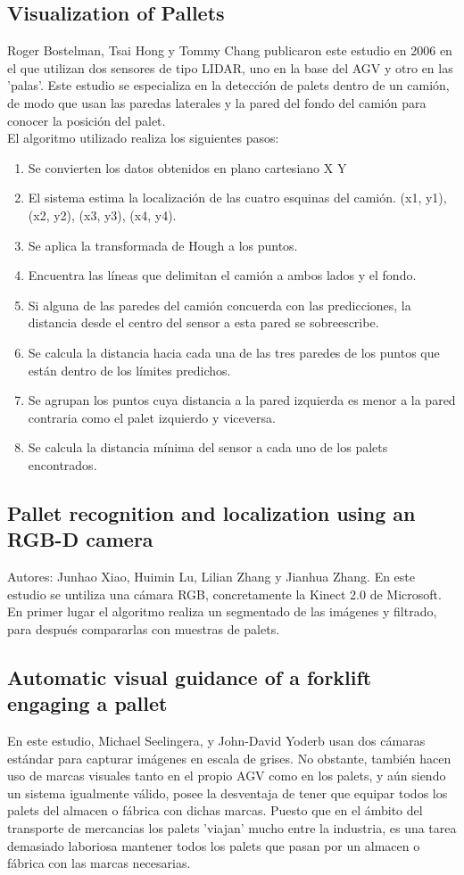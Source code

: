\subsection{Visualization of Pallets}
Roger Bostelman, Tsai Hong y Tommy Chang publicaron este estudio en 2006 en el que utilizan dos sensores de tipo LIDAR, uno en la base del AGV y otro en las 'palas'.
Este estudio se especializa en la detección de palets dentro de un camión, de modo que usan las paredas laterales y la pared del fondo del camión para conocer la posición del palet.\\
El algoritmo utilizado realiza los siguientes pasos:
\begin{enumerate}
\item Se convierten los datos obtenidos en plano cartesiano X Y
\item El sistema estima la localización de las cuatro esquinas del camión. (x1, y1), (x2, y2), (x3, y3), (x4, y4).
\item Se aplica la transformada de Hough a los puntos.
\item Encuentra las líneas que delimitan el camión a ambos lados y el fondo.
\item Si alguna de las paredes del camión concuerda con las predicciones, la distancia desde el centro del sensor a esta pared se sobreescribe.
\item Se calcula la distancia hacia cada una de las tres paredes de los puntos que están dentro de los límites predichos.
\item Se agrupan los puntos cuya distancia a la pared izquierda es menor a la pared contraria como el palet izquierdo y viceversa.
\item Se calcula la distancia mínima del sensor a cada uno de los palets encontrados.
\end{enumerate}

 \subsection{Pallet recognition and localization using an RGB-D camera}
Autores: Junhao Xiao, Huimin Lu, Lilian Zhang y Jianhua Zhang.
En este estudio se untiliza una cámara RGB, concretamente la Kinect 2.0 de Microsoft.
En primer lugar el algoritmo realiza un segmentado de las imágenes y filtrado, para después compararlas con muestras de palets.

\subsection{Automatic visual guidance of a forklift engaging a pallet}
En este estudio, Michael Seelingera, y John-David Yoderb usan dos cámaras estándar para capturar imágenes en escala de grises.
No obstante, también hacen uso de marcas visuales tanto en el propio AGV como en los palets, y aún siendo un sistema igualmente válido, posee la desventaja de tener que equipar todos los palets del almacen o fábrica con dichas marcas. Puesto que en el ámbito del transporte de mercancias los palets 'viajan' mucho entre la industria, es una tarea demasiado laboriosa mantener todos los palets que pasan por un almacen o fábrica con las marcas necesarias.

